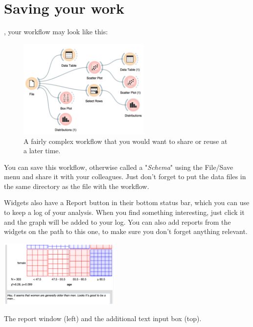 \chapter{Saving your work}
\label{ch:saving_your_work}

, your workflow may look like this:
\begin{figure}[h]
  \centering
  \includegraphics[width=65mm]{saving-fig1.png}%
  \caption{A fairly complex workflow that you would want to share or reuse at a later time.}
  \label{fig:saveing-fig1}
\end{figure}

You can save this workflow, otherwise called a "\textit{Schema}" using the File/Save menu and share it with your colleagues. Just don't forget to put the data files in the same directory as the file with the workflow.

Widgets also have a Report button in their bottom status bar, which you can use to keep a log of your analysis. When you find something interesting, just click it and the graph will be added to your log. You can also add reports from the widgets on the path to this one, to make sure you don't forget anything relevant.

\begin{marginfigure}
  \includegraphics[width=60mm]{saving-fig3.png}%
  \caption{The report window (left) and the additional text input box (top).}
  \label{fig:saveing-fig3}
\end{marginfigure}

